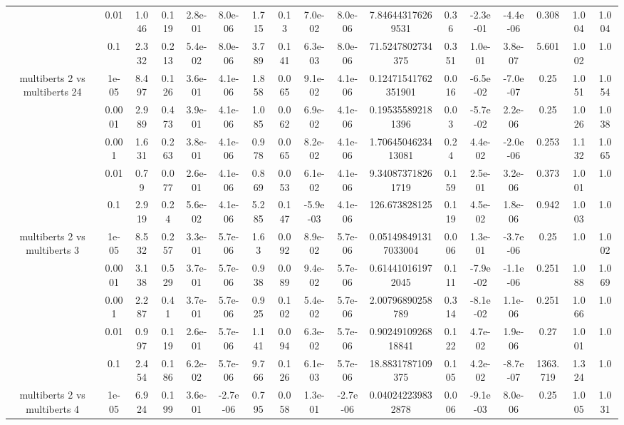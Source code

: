 \begin{tabular}{|c|c|c|c|c|c|c|c|c|c|c|c|c|c|c|c|c|}
 & 0.01 & 1.046 & 0.119 & 2.8e-01 & 8.0e-06 & 1.715 & 0.13 & 7.0e-02 & 8.0e-06 & 7.846443176269531 & 0.36 & -2.3e-01 & -4.4e-06 & 0.308 & 1.004 & 1.004 \\
 & 0.1 & 2.332 & 0.213 & 5.4e-02 & 8.0e-06 & 3.789 & 0.141 & 6.3e-03 & 8.0e-06 & 71.5247802734375 & 0.351 & 1.0e-01 & 3.8e-07 & 5.601 & 1.002 & 1.0 \\
\hline
\multirow{5}{*}{multiberts 2 vs multiberts 24} & 1e-05 & 8.497 & 0.126 & 3.6e-01 & 4.1e-06 & 1.858 & 0.065 & 9.1e-02 & 4.1e-06 & 0.12471541762351901 & 0.016 & -6.5e-02 & -7.0e-07 & 0.25 & 1.051 & 1.054 \\
 & 0.0001 & 2.989 & 0.473 & 3.9e-01 & 4.1e-06 & 1.085 & 0.062 & 6.9e-02 & 4.1e-06 & 0.195355892181396 & 0.03 & -5.7e-02 & 2.2e-06 & 0.25 & 1.026 & 1.038 \\
 & 0.001 & 1.631 & 0.263 & 3.8e-01 & 4.1e-06 & 0.978 & 0.065 & 8.2e-02 & 4.1e-06 & 1.7064504623413081 & 0.24 & 4.4e-02 & -2.0e-06 & 0.253 & 1.132 & 1.065 \\
 & 0.01 & 0.79 & 0.077 & 2.6e-01 & 4.1e-06 & 0.869 & 0.053 & 6.1e-02 & 4.1e-06 & 9.340873718261719 & 0.159 & 2.5e-01 & 3.2e-06 & 0.373 & 1.001 & 1.0 \\
 & 0.1 & 2.919 & 0.24 & 5.6e-02 & 4.1e-06 & 5.285 & 0.147 & -5.9e-03 & 4.1e-06 & 126.673828125 & 0.119 & 4.5e-02 & 1.8e-06 & 0.942 & 1.003 & 1.0 \\
\hline
\multirow{5}{*}{multiberts 2 vs multiberts 3} & 1e-05 & 8.532 & 0.257 & 3.3e-01 & 5.7e-06 & 1.63 & 0.092 & 8.9e-02 & 5.7e-06 & 0.051498491317033004 & 0.006 & 1.3e-01 & -3.7e-06 & 0.25 & 1.0 & 1.002 \\
 & 0.0001 & 3.138 & 0.529 & 3.7e-01 & 5.7e-06 & 0.938 & 0.089 & 9.4e-02 & 5.7e-06 & 0.614410161972045 & 0.111 & -7.9e-02 & -1.1e-06 & 0.251 & 1.088 & 1.069 \\
 & 0.001 & 2.287 & 0.41 & 3.7e-01 & 5.7e-06 & 0.925 & 0.102 & 5.4e-02 & 5.7e-06 & 2.00796890258789 & 0.314 & -8.1e-02 & 1.1e-06 & 0.251 & 1.066 & 1.0 \\
 & 0.01 & 0.997 & 0.119 & 2.6e-01 & 5.7e-06 & 1.141 & 0.094 & 6.3e-02 & 5.7e-06 & 0.9024910926818841 & 0.122 & 4.7e-02 & 1.9e-06 & 0.27 & 1.001 & 1.0 \\
 & 0.1 & 2.454 & 0.186 & 6.2e-02 & 5.7e-06 & 9.766 & 0.126 & 6.1e-03 & 5.7e-06 & 18.8831787109375 & 0.105 & 4.2e-02 & -8.7e-07 & 1363.719 & 1.324 & 1.0 \\
\hline
\multirow{5}{*}{multiberts 2 vs multiberts 4} & 1e-05 & 6.924 & 0.199 & 3.6e-01 & -2.7e-06 & 0.795 & 0.058 & 1.3e-01 & -2.7e-06 & 0.040242239832878 & 0.006 & -9.1e-03 & 8.0e-06 & 0.25 & 1.005 & 1.031 \\

\end{tabular}
